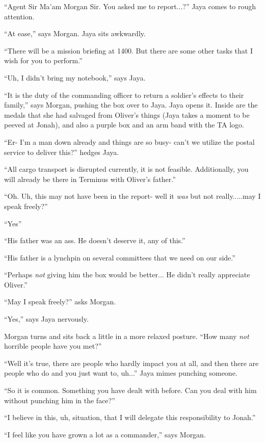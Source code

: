 ``Agent Sir Ma'am Morgan Sir.  You asked me to report...?'' Jaya comes to rough attention.

``At ease,'' says Morgan.  Jaya sits awkwardly.

``There will be a mission briefing at 1400.  But there are some other tasks that I wish for you to perform.''

``Uh, I didn't bring my notebook,'' says Jaya.

``It is the duty of the commanding officer to return a soldier's effects to their family,'' says Morgan, pushing the box over to Jaya.  Jaya opens it.  Inside are the medals that she had salvaged from Oliver's things (Jaya takes a moment to be peeved at Jonah), and also a purple box and an arm band with the TA logo.

``Er- I'm a man down already and things are so busy- can't we utilize the postal service to deliver this?'' hedges Jaya.

``All cargo transport is disrupted currently, it is not feasible.  Additionally, you will already be there in Terminus with Oliver's father.''

``Oh.  Uh, this may not have been in the report- well it \textit{was} but not really.....may I speak freely?''

``Yes''

``His father was an ass.  He doesn't deserve it, any of this.''

``His father is a lynchpin on several committees that we need on our side.''

``Perhaps \textit{not} giving him the box would be better... He didn't really appreciate Oliver.''

``May I speak freely?'' asks Morgan.

``Yes,'' says Jaya nervously.

Morgan turns and sits back a little in a more relaxed posture.  ``How many \textit{not} horrible people have you met?''

``Well it's true, there are people who hardly impact you at all, and then there are people who do and you just want to, uh...'' Jaya mimes punching someone.

``So it is common.  Something you have dealt with before.  Can you deal with him without punching him in the face?''

``I believe in this, uh, situation, that I will delegate this responsibility to Jonah.''

``I feel like you have grown a lot as a commander,'' says Morgan.

